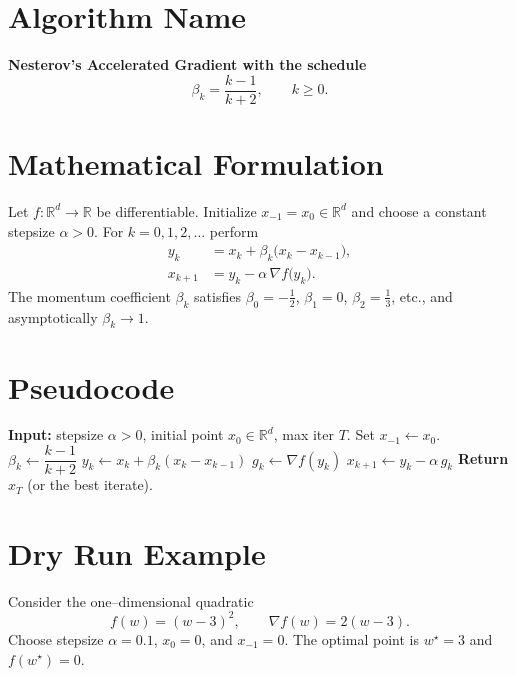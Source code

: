 \documentclass{article}
\newcommand{\grad}{\nabla}
\begin{document}
\section*{Algorithm Name}
\textbf{Nesterov’s Accelerated Gradient with the schedule } 
\[
\beta_k=\frac{k-1}{k+2},\qquad k\ge 0 .
\]

\section*{Mathematical Formulation}
Let $f:\mathbb{R}^d\rightarrow\mathbb{R}$ be differentiable.  
Initialize $x_{-1}=x_0\in\mathbb{R}^d$ and choose a constant stepsize $\alpha>0$.  
For $k=0,1,2,\dots$ perform
\[
\begin{aligned}
y_k &= x_k+\beta_k\bigl(x_k-x_{k-1}\bigr), \tag{1}\\
x_{k+1} &= y_k-\alpha\,\grad f\!\bigl(y_k\bigr). \tag{2}
\end{aligned}
\]
The momentum coefficient $\beta_k$ satisfies $\beta_0=-\tfrac12$, $\beta_1=0$, $\beta_2=\tfrac13$, etc., and asymptotically $\beta_k\to 1$.

\section*{Pseudocode}
\begin{algorithm}[H]
\caption{Accelerated Gradient (AG) with $\beta_k=\frac{k-1}{k+2}$}
\begin{algorithmic}[1]
\State \textbf{Input:} stepsize $\alpha>0$, initial point $x_0\in\mathbb{R}^d$, max iter $T$.
\State Set $x_{-1}\gets x_0$.
    \State $\beta_k \gets \dfrac{k-1}{k+2}$ 
    \State $y_k \gets x_k + \beta_k (x_k - x_{k-1})$ 
    \State $g_k \gets \grad f(y_k)$ 
    \State $x_{k+1} \gets y_k - \alpha\, g_k$ 
\EndFor
\State \textbf{Return} $x_T$ (or the best iterate).
\end{algorithmic}
\end{algorithm}

\section*{Dry Run Example}
Consider the one–dimensional quadratic 
\[
f(w)=(w-3)^2,\qquad \grad f(w)=2(w-3).
\]
Choose stepsize $\alpha=0.1$, $x_0=0$, and $x_{-1}=0$.  
The optimal point is $w^\star=3$ and $f(w^\star)=0$.
\end{document}
